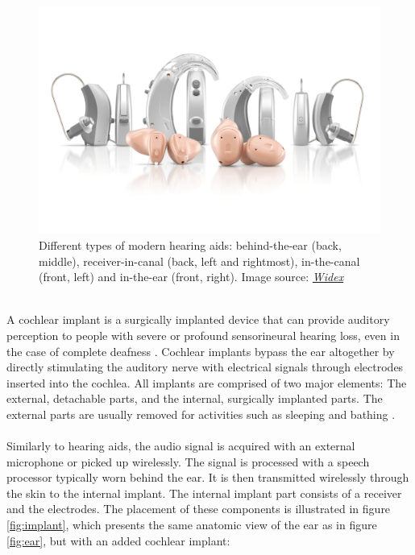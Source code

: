\documentclass[english, 12pt, a4paper, pdftex, elec, utf8]{aaltothesis}
\begin{document}
\begin{figure}[b]
	\centering 
	\includegraphics[trim={0cm 4cm 0cm 4cm}, clip, width=\textwidth]{hearingaids.png} 	%
	\caption{Different types of modern hearing aids: behind-the-ear (back, middle), receiver-in-canal (back, left and rightmost), in-the-canal (front, left) and in-the-ear (front, right). Image source: \href{https://www.widex.pro/en/products/unique-hearing-aids}{\textit{Widex}}}
	\label{fig:hearingaids} 
\end{figure} \\
A cochlear implant is a surgically implanted device that can provide auditory perception to people with severe or profound sensorineural hearing loss, even in the case of complete deafness \cite{moore2007cochlear, peterson2010cochlear}. Cochlear implants bypass the ear altogether by directly stimulating the auditory nerve with electrical signals through electrodes inserted into the cochlea. All implants are comprised of two major elements: The external, detachable parts, and the internal, surgically implanted parts. The external parts are usually removed for activities such as sleeping and bathing \cite{peterson2010cochlear}. \\\\
Similarly to hearing aids, the audio signal is acquired with an external microphone or picked up wirelessly. The signal is processed with a speech processor typically worn behind the ear. It is then transmitted wirelessly through the skin to the internal implant. The internal implant part consists of a receiver and the electrodes. The placement of these components is illustrated in figure \ref{fig:implant}, which presents the same anatomic view of the ear as in figure \ref{fig:ear}, but with an added cochlear implant: \\
\end{document}

